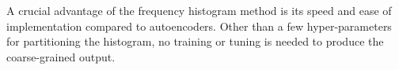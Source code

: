 A crucial advantage of the frequency histogram method is its speed and ease of
implementation compared to autoencoders. Other than a few hyper-parameters for
partitioning the histogram, no training or tuning is needed to produce the
coarse-grained output.

\begin{figure}[ht]
  \centering
  \begin{subfigure}{.052\linewidth}

\end{subfigure}
\end{figure}
